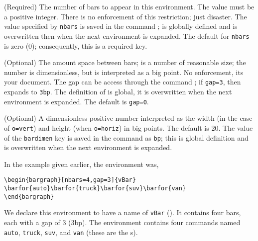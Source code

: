 \documentclass{article}
\edef\amtIndent{\the\parindent}
\begin{document}
\begin{aebDescript}
   \item[\texttt{nbars=\ameta{num}}] (Required) The number of bars to appear in this
        environment. The value  must be a positive
       integer. There is no enforcement of this restriction; just disaster.
       The value specified by
       \texttt{nbars} is saved in the
       command ;  is globally defined and is overwritten
       then when the next  environment is expanded. The default
       for \texttt{nbars} is zero (0); consequently, this is a required key.
   \item[\texttt{gap=\ameta{num}}] (Optional) The amount space between bars; 
       is a number of reasonable size; the number is dimensionless, but is
       interpreted as a big point. No enforcement, its your document. The gap
       can be access through the command ;
       if \texttt{gap=3}, then  expands to \texttt{3bp}. The definition of 
       is global, it is overwritten when the next  environment is expanded. The default
       is \texttt{gap=0}.
   \item[\texttt{bardimen=\ameta{num}}] (Optional) A dimensionless positive number
       interpreted as the width (in the case of \texttt{o=vert}) and height
       (when \texttt{o=horiz}) in big points. The default is 20. The value of the
       \texttt{bardimen} key is saved in the 
       command as \texttt{bp}; this is  global definition and is overwritten when
       the next  environment is expanded.
\end{aebDescript}
In the example given earlier, the  environment was,
\begin{Verbatim}[xleftmargin=\amtIndent,fontsize=\small]
\begin{bargraph}[nbars=4,gap=3]{vBar}
\barfor{auto}\barfor{truck}\barfor{suv}\barfor{van}
\end{bargraph}
\end{Verbatim}
We declare this environment to have a name of \texttt{vBar}
(). It contains four bars, each with a gap of 3 (3bp). The
environment contains four  commands named \texttt{auto},
\texttt{truck}, \texttt{suv}, and \texttt{van} (these are the
s).
\end{document}
